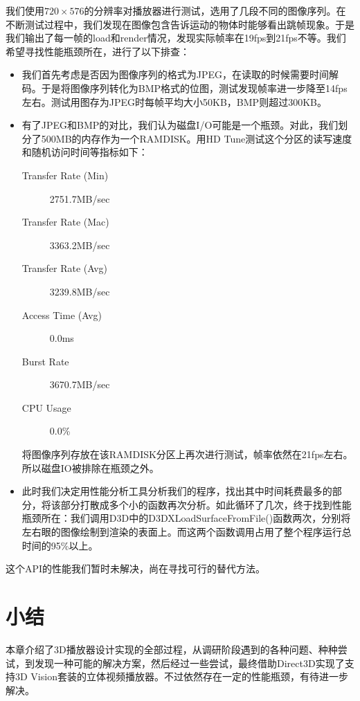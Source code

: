 我们使用$720\times576$的分辨率对播放器进行测试，选用了几段不同的图像序列。在不断测试过程中，我们发现在图像包含告诉运动的物体时能够看出跳帧现象。于是我们输出了每一帧的load和render情况，发现实际帧率在19fps到21fps不等。我们希望寻找性能瓶颈所在，进行了以下排查：
\begin{itemize}
\item 我们首先考虑是否因为图像序列的格式为JPEG，在读取的时候需要时间解码。于是将图像序列转化为BMP格式的位图，测试发现帧率进一步降至14fps左右。测试用图存为JPEG时每帧平均大小50KB，BMP则超过300KB。
\item 有了JPEG和BMP的对比，我们认为磁盘I/O可能是一个瓶颈。对此，我们划分了500MB的内存作为一个RAMDISK。用HD Tune测试这个分区的读写速度和随机访问时间等指标如下：
\begin{description}
\item[Transfer Rate (Min)] 2751.7MB/sec
\item[Transfer Rate (Mac)] 3363.2MB/sec
\item[Transfer Rate (Avg)] 3239.8MB/sec
\item[Access Time (Avg)] 0.0ms
\item[Burst Rate] 3670.7MB/sec
\item[CPU Usage] 0.0\%
\end{description}
将图像序列存放在该RAMDISK分区上再次进行测试，帧率依然在21fps左右。所以磁盘IO被排除在瓶颈之外。
\item 此时我们决定用性能分析工具分析我们的程序，找出其中时间耗费最多的部分，将该部分打散成多个小的函数再次分析。如此循环了几次，终于找到性能瓶颈所在：我们调用D3D中的D3DXLoadSurfaceFromFile()函数两次，分别将左右眼的图像绘制到渲染的表面上。而这两个函数调用占用了整个程序运行总时间的95\%以上。
\end{itemize}
这个API的性能我们暂时未解决，尚在寻找可行的替代方法。


\section{小结}
\label{sec:sum7}

本章介绍了3D播放器设计实现的全部过程，从调研阶段遇到的各种问题、种种尝试，到发现一种可能的解决方案，然后经过一些尝试，最终借助Direct3D实现了支持3D Vision套装的立体视频播放器。不过依然存在一定的性能瓶颈，有待进一步解决。